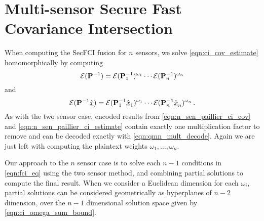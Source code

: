 \documentclass[letterpaper, 10 pt, journal, twoside]{ieeetran}  %
\providecommand{\DIFadd}[1]{{\protect\color{blue}\uwave{#1}}} %
\providecommand{\DIFaddbegin}{} %
\providecommand{\DIFaddend}{} %
\begin{document}
\section{Multi-sensor Secure Fast Covariance Intersection} \label{sec:multi_secfci}
When computing the SecFCI fusion for $n$ sensors, we solve \eqref{eqn:ci_cov_estimate} homomorphically by computing
\begin{equation}
   \mathcal{E}({{\mathbf{P}}}^{-1}) = \mathcal{E}({{\mathbf{P}}}^{-1}_1)^{\omega_1}\cdots\mathcal{E}({{\mathbf{P}}}^{-1}_n)^{\omega_n} \label{eqn:n_sen_paillier_ci_cov}
\end{equation}
and
\begin{equation}
   \mathcal{E}({{\mathbf{P}}}^{-1}\hat{{\underline{x}}}) = \mathcal{E}({{\mathbf{P}}}^{-1}_1\hat{{\underline{x}}}_1)^{\omega_1}\cdots\mathcal{E}({{\mathbf{P}}}^{-1}_n\hat{{\underline{x}}}_n)^{\omega_n}\,. \label{eqn:n_sen_paillier_ci_estimate}
\end{equation}
As with the two sensor case, encoded results from \eqref{eqn:n_sen_paillier_ci_cov} and \eqref{eqn:n_sen_paillier_ci_estimate} contain exactly one multiplication factor to remove and can be decoded exactly with \eqref{eqn:qmn_mult_decode}. Again we are just left with \DIFaddbegin \DIFadd{the task of }\DIFaddend computing the plaintext weights $\omega_1,\dots,\omega_n$.

Our approach to the $n$ sensor case is to solve each $n-1$ conditions in \eqref{eqn:fci_eq} using the two sensor method, and combining partial solutions to compute the final result. When we consider a Euclidean dimension for each $\omega_i$, partial solutions can be considered geometrically as hyperplanes of $n-2$ dimension, over the $n-1$ dimensional solution space given by \eqref{eqn:ci_omega_sum_bound}. 
\end{document}
